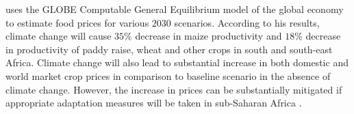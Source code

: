 \documentclass[a4paper,12pt]{article}
\begin{document}
\cite{OxfamIDS} uses the GLOBE Computable General Equilibrium model of the global economy to estimate food prices for various $2030$ scenarios. According to his results, climate change will cause $35\%$ decrease in maize productivity and $18\%$ decrease in productivity of paddy raise, wheat and other crops in south and south-east Africa. Climate change will also lead to substantial increase in both domestic and world market crop prices in comparison to baseline scenario in the absence of climate change. However, the increase in prices can be substantially mitigated if appropriate adaptation measures will be taken in sub-Saharan Africa \citet{OxfamIDS}.



\end{document}
